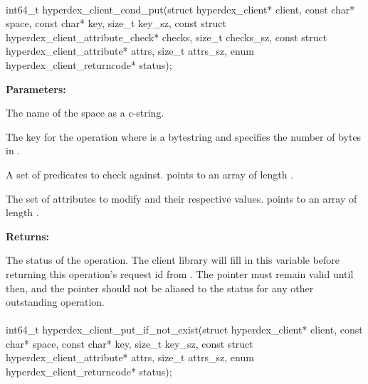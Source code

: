 \paragraph{}
\label{api:c:cond_put}
\begin{ccode}
int64_t hyperdex_client_cond_put(struct hyperdex_client* client,
        const char* space,
        const char* key, size_t key_sz,
        const struct hyperdex_client_attribute_check* checks, size_t checks_sz,
        const struct hyperdex_client_attribute* attrs, size_t attrs_sz,
        enum hyperdex_client_returncode* status);
\end{ccode}
\funcdesc 

\noindent\textbf{Parameters:}
\begin{description}[labelindent=\widthof{{\code{checks}, \code{checks\_sz}}},leftmargin=*,noitemsep,nolistsep,align=right]
\item[\code{space}] The name of the space as a c-string.
\item[\code{key}, \code{key\_sz}] The key for the operation where  is a bytestring and  specifies the number of bytes in .
\item[\code{checks}, \code{checks\_sz}] A set of predicates to check against.   points to an array of length .
\item[\code{attrs}, \code{attrs\_sz}] The set of attributes to modify and their respective values.   points to an array of length .
\end{description}

\noindent\textbf{Returns:}
\begin{description}[labelindent=\widthof{{\code{status}}},leftmargin=*,noitemsep,nolistsep,align=right]
\item[\code{status}] The status of the operation.  The client library will fill in this variable before returning this operation's request id from .  The pointer must remain valid until then, and the pointer should not be aliased to the status for any other outstanding operation.
\end{description}

\paragraph{}
\label{api:c:put_if_not_exist}
\begin{ccode}
int64_t hyperdex_client_put_if_not_exist(struct hyperdex_client* client,
        const char* space,
        const char* key, size_t key_sz,
        const struct hyperdex_client_attribute* attrs, size_t attrs_sz,
        enum hyperdex_client_returncode* status);
\end{ccode}
\funcdesc 

